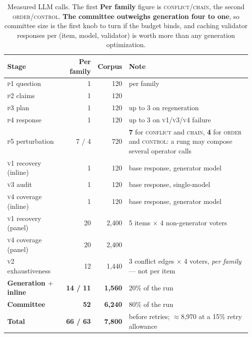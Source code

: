 \documentclass[11pt]{article}
\begin{document}
\begin{table}[h]\centering\small
\renewcommand{\arraystretch}{1.15}
\begin{tabular}{@{}lrrp{5.4cm}@{}}
\toprule
\textbf{Stage} & \textbf{Per family} & \textbf{Corpus} & \textbf{Note}\\
\midrule
\textsc{p1} question        & 1        & 120   & per family\\
\textsc{p2} claims          & 1        & 120   & \\
\textsc{p3} plan            & 1        & 120   & up to 3 on regeneration\\
\textsc{p4} response        & 1        & 120   & up to 3 on \textsc{v1}/\textsc{v3}/\textsc{v4} failure\\
\textsc{p5} perturbation    & 7 / 4    & 720   & \textbf{7} for \textsc{conflict} and
  \textsc{chain}, \textbf{4} for \textsc{order} and \textsc{control}: a rung may compose several
  operator calls\\
\midrule
\textsc{v1} recovery (inline) & 1      & 120   & base response, generator model\\
\textsc{v3} audit             & 1      & 120   & base response, single-model\\
\textsc{v4} coverage (inline) & 1      & 120   & base response, generator model\\
\midrule
\textsc{v1} recovery (panel)  & 20     & 2{,}400 & 5 items $\times$ 4 non-generator voters\\
\textsc{v4} coverage (panel)  & 20     & 2{,}400 & \\
\textsc{v2} exhaustiveness    & 12     & 1{,}440 & 3 conflict edges $\times$ 4 voters,
  \emph{per family} --- not per item\\
\midrule
\textbf{Generation $+$ inline} & \textbf{14 / 11} & \textbf{1{,}560} & 20\% of the run\\
\textbf{Committee}             & \textbf{52}      & \textbf{6{,}240} & 80\% of the run\\
\textbf{Total}                 & \textbf{66 / 63} & \textbf{7{,}800} &
  before retries; $\approx$8{,}970 at a 15\% retry allowance\\
\bottomrule
\end{tabular}
\caption{Measured LLM calls. The first \textbf{Per family} figure is \textsc{conflict}/\textsc{chain},
the second \textsc{order}/\textsc{control}. \textbf{The committee outweighs generation four to one},
so committee size is the first knob to turn if the budget binds, and caching validator responses per
(item, model, validator) is worth more than any generation optimization.}
\label{tab:cost}
\end{table}
\end{document}
